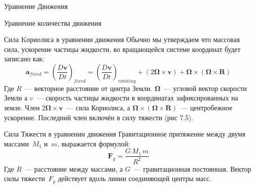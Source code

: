\begin{chapter}{Уравнение Движения}
\begin{section}{Уравнение количества движения}
\begin{paragraph}{Сила Kориолиса в уравнении движения}
Обычно мы утверждаем что массовая сила, ускорение частицы жидкости, во
вращающейся системе координат будет записано как:
\begin{equation}
\textbf{a}_{fixed} = \left(\frac{D\textbf{v}}{Dt}\right)_{fixed} =
 \left(\frac{D\textbf{v}}{Dt}\right)_{rotating} + \left( 2 \boldsymbol{\Omega}
\times \mathbf{v} \right) + \boldsymbol{\Omega} \times \left(
\boldsymbol{\Omega} \times \mathbf{R} \right)
\end{equation}
Где $R$~--- векторное расстояние от центра
Земли. $\boldsymbol{\Omega}$~--- угловой вектор скорости Земли а
$v$~--- скорость частицы жидкости в координатах зафиксированных на
земле. Член $2 \boldsymbol{\Omega} \times \mathbf{v}$~--- сила
Кориолиса, а $\boldsymbol{\Omega} \times \left( \boldsymbol{\Omega}
\times \mathbf{R} \right)$~--- центробежное ускорение. Последний член
включён в силу тяжести (рис 7.5).
%
\end{paragraph}

\begin{paragraph}{Сила Тяжести в уравнении движения}
Гравитационное притяжение между двумя массами~$M_1$ и~$m$, выражается
формулой:
\begin{displaymath}
\textbf{F}_g = \frac{G\,M_1\, m}{R^2}
\end{displaymath}
Где $R$~--- расстояние между массами, а $G$~--- гравитационная
постоянная. Вектор силы тяжести~$F_g$ действует вдоль линии
соединяющей центры масс. 
%


\end{paragraph}
\end{section}
\end{chapter}
